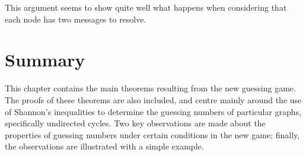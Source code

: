 This argument seems to show quite well what happens when considering that each node has two messages to resolve.

\section{Summary}

This chapter contains the main theorems resulting from the new guessing game. The proofs of these theorems are also included, and centre mainly around the use of Shannon's inequalities to determine the guessing numbers of particular graphs, specifically undirected cycles. Two key observations are made about the properties of guessing numbers under certain conditions in the new game; finally, the observations are illustrated with a simple example.
